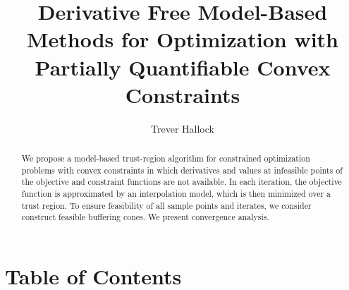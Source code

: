 \documentclass{article}
\title{Derivative Free Model-Based Methods for Optimization with Partially Quantifiable Convex Constraints}
\author{Trever Hallock}
\theoremstyle{case}
\numberwithin{theorem}{subsection}
\newcommand{\oalpha}{\tau_{\Delta}}
\begin{document}
\maketitle

\begin{abstract}

We propose a model-based trust-region algorithm for constrained optimization problems with convex constraints 
in which derivatives and values at infeasible points of the objective and constraint functions are not available.
In each iteration, the objective function is approximated by an interpolation model, which is then minimized over a trust region.
To ensure feasibility of all sample points and iterates, we consider construct feasible buffering cones.
We present convergence analysis.

\end{abstract}

\newpage

\section{Table of Contents}

\tableofcontents

\newpage



%
%
%
%
% 
% 
% 
% 
% 
% 
% 	
% 
% 	
\end{document}
